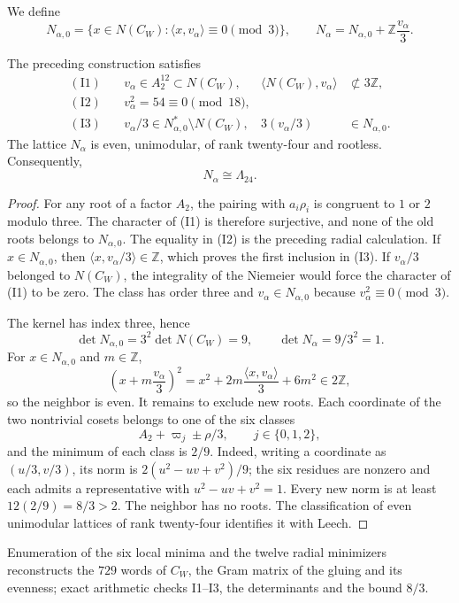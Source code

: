 We define
\[
N_{\alpha,0}=\{x\in N(C_W):
\langle x,v_\alpha\rangle\equiv0\pmod3\},
\qquad
N_\alpha=N_{\alpha,0}+\mathbb Z\frac{v_\alpha}{3}.
\]

\begin{theorem}
The preceding construction satisfies
\begin{align*}
\mathrm{(I1)}\quad&v_\alpha\in A_2^{12}\subset N(C_W),
&\langle N(C_W),v_\alpha\rangle&\not\subset3\mathbb Z,\\
\mathrm{(I2)}\quad&v_\alpha^2=54\equiv0\pmod{18},\\
\mathrm{(I3)}\quad&v_\alpha/3\in
N_{\alpha,0}^*\setminus N(C_W),
&3(v_\alpha/3)&\in N_{\alpha,0}.
\end{align*}
The lattice \(N_\alpha\) is even, unimodular, of rank twenty-four and
rootless. Consequently,
\[
N_\alpha\cong\Lambda_{24}.
\]
\end{theorem}

\begin{proof}
For any root of a factor \(A_2\), the pairing with
\(a_i\rho_i\) is congruent to \(1\) or \(2\) modulo three. The character of
(I1) is therefore surjective, and none of the old roots belongs to
\(N_{\alpha,0}\). The equality in (I2) is the preceding radial calculation. If
\(x\in N_{\alpha,0}\), then
\(\langle x,v_\alpha/3\rangle\in\mathbb Z\), which proves the first
inclusion in (I3). If \(v_\alpha/3\) belonged to \(N(C_W)\), the
integrality of the Niemeier would force the character of (I1) to be zero. The
class has order three and \(v_\alpha\in N_{\alpha,0}\) because
\(v_\alpha^2\equiv0\pmod3\).

The kernel has index three, hence
\[
\det N_{\alpha,0}=3^2\det N(C_W)=9,
\qquad
\det N_\alpha=9/3^2=1.
\]
For \(x\in N_{\alpha,0}\) and \(m\in\mathbb Z\),
\[
\left(x+m\frac{v_\alpha}{3}\right)^2
=x^2+2m\frac{\langle x,v_\alpha\rangle}{3}+6m^2
\in2\mathbb Z,
\]
so the neighbor is even. It remains to exclude new roots. Each coordinate of
the two nontrivial cosets belongs to one of the six classes
\[
A_2+\varpi_j\pm\rho/3,\qquad j\in\{0,1,2\},
\]
and the minimum of each class is \(2/9\). Indeed, writing a coordinate
as \((u/3,v/3)\), its norm is
\(2(u^2-uv+v^2)/9\); the six residues are nonzero and each admits a
representative with \(u^2-uv+v^2=1\). Every
new norm is at least \(12(2/9)=8/3>2\). The neighbor has no roots. The
classification of even unimodular lattices of rank twenty-four
identifies it with Leech.
\end{proof}

Enumeration of the six local minima and the twelve radial minimizers
reconstructs the \(729\) words of \(C_W\), the Gram matrix of the gluing and
its evenness; exact arithmetic checks I1--I3, the determinants and the bound
\(8/3\).

